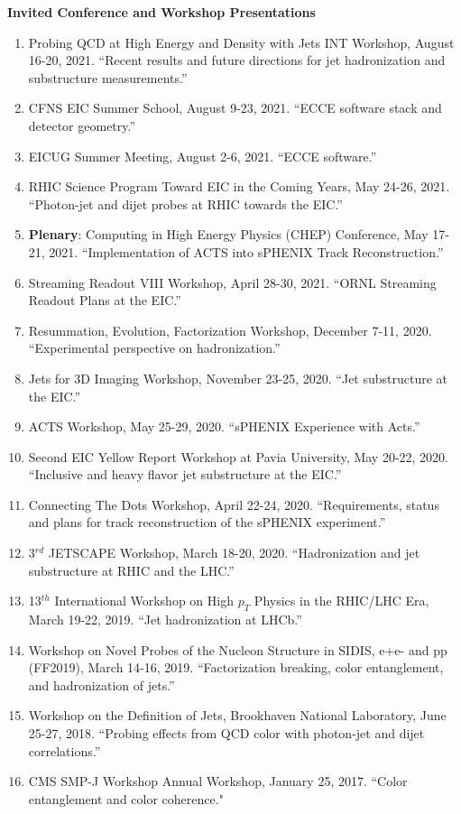 \documentclass[11pt]{article}
\begin{document}
\vspace{7pt}

\begin{flushleft}
	\LARGE\textbf{Invited Conference and Workshop Presentations}
	\normalsize
	\begin{enumerate}
		\item Probing QCD at High Energy and Density with Jets INT Workshop, August 16-20, 2021. ``Recent results and future directions for jet hadronization and substructure measurements.''
		\item CFNS EIC Summer School, August 9-23, 2021. ``ECCE software stack and detector geometry.'' 
		\item EICUG Summer Meeting, August 2-6, 2021. ``ECCE software.''
		\item RHIC Science Program Toward EIC in the Coming Years, May 24-26, 2021. ``Photon-jet and dijet probes at RHIC towards the EIC.''
		\item {\bf{Plenary}}: Computing in High Energy Physics (CHEP) Conference, May 17-21, 2021. ``Implementation of ACTS into sPHENIX Track Reconstruction.''
		\item Streaming Readout VIII Workshop, April 28-30, 2021. ``ORNL Streaming Readout Plans at the EIC.''\\
		\item Resummation, Evolution, Factorization Workshop, December 7-11, 2020. ``Experimental perspective on hadronization.''
		\item Jets for 3D Imaging Workshop, November 23-25, 2020. ``Jet substructure at the EIC.''
		\item ACTS Workshop, May 25-29, 2020. ``sPHENIX Experience with Acts.''
		\item Second EIC Yellow Report Workshop at Pavia University, May 20-22, 2020. ``Inclusive and heavy flavor jet substructure at the EIC.''
		\item Connecting The Dots Workshop, April 22-24, 2020. ``Requirements, status and plans for track reconstruction of the sPHENIX experiment.''
		\item 3$^{rd}$ JETSCAPE Workshop, March 18-20, 2020. ``Hadronization and jet substructure at RHIC and the LHC.''
		\item 13$^{th}$ International Workshop on High $p_T$ Physics in the RHIC/LHC Era, March 19-22, 2019. ``Jet hadronization at LHCb.''
		\item Workshop on Novel Probes of the Nucleon Structure in SIDIS, e+e- and pp (FF2019), March 14-16, 2019. ``Factorization breaking, color entanglement, and hadronization of jets.''
		\item Workshop on the Definition of Jets, Brookhaven National Laboratory, June 25-27, 2018. ``Probing effects from QCD color with photon-jet and dijet correlations.''
		\item CMS SMP-J Workshop Annual Workshop, January 25, 2017. ``Color entanglement and color coherence."
	\end{enumerate}
\end{flushleft}
\end{document}

